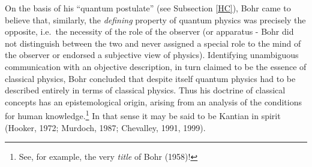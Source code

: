\documentclass[12pt]{article}
\begin{document}
 On the basis of his ``quantum postulate'' (see Subsection \ref{HC}), Bohr came to believe that, similarly, the 
 \textit{defining} property of quantum physics was precisely the opposite, i.e.\ the necessity of the role of the observer (or apparatus - Bohr did not distinguish between the two and  never assigned a special role to the mind of the observer or endorsed a subjective view of physics). Identifying unambiguous communication with an objective description, in turn claimed to be the essence of classical physics, 
 Bohr concluded that despite itself quantum physics had to be described entirely in terms of classical physics. Thus his doctrine of classical concepts
has an epistemological origin, arising from an analysis of the conditions for human knowledge.\footnote{See, for example, the very {\it title} of Bohr (1958)!} In that sense it may be said to be Kantian in spirit (Hooker, 1972; Murdoch, 1987; Chevalley, 1991, 1999). 
\end{document}
